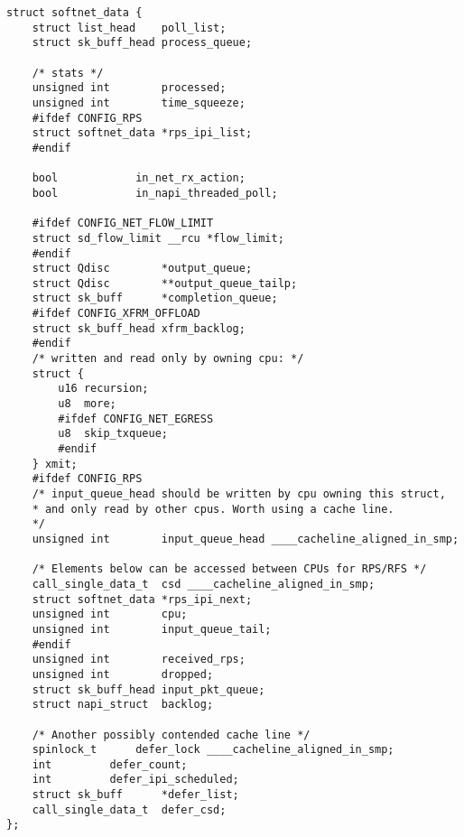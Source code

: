 \begin{center}
	\captionsetup{justification=raggedright,singlelinecheck=off}
	\begin{lstlisting}[label=lst:softnet_data,caption=Структуры softnet\_data]
struct softnet_data {
	struct list_head	poll_list;
	struct sk_buff_head	process_queue;
	
	/* stats */
	unsigned int		processed;
	unsigned int		time_squeeze;
	#ifdef CONFIG_RPS
	struct softnet_data	*rps_ipi_list;
	#endif
	
	bool			in_net_rx_action;
	bool			in_napi_threaded_poll;
	
	#ifdef CONFIG_NET_FLOW_LIMIT
	struct sd_flow_limit __rcu *flow_limit;
	#endif
	struct Qdisc		*output_queue;
	struct Qdisc		**output_queue_tailp;
	struct sk_buff		*completion_queue;
	#ifdef CONFIG_XFRM_OFFLOAD
	struct sk_buff_head	xfrm_backlog;
	#endif
	/* written and read only by owning cpu: */
	struct {
		u16 recursion;
		u8  more;
		#ifdef CONFIG_NET_EGRESS
		u8  skip_txqueue;
		#endif
	} xmit;
	#ifdef CONFIG_RPS
	/* input_queue_head should be written by cpu owning this struct,
	* and only read by other cpus. Worth using a cache line.
	*/
	unsigned int		input_queue_head ____cacheline_aligned_in_smp;
	
	/* Elements below can be accessed between CPUs for RPS/RFS */
	call_single_data_t	csd ____cacheline_aligned_in_smp;
	struct softnet_data	*rps_ipi_next;
	unsigned int		cpu;
	unsigned int		input_queue_tail;
	#endif
	unsigned int		received_rps;
	unsigned int		dropped;
	struct sk_buff_head	input_pkt_queue;
	struct napi_struct	backlog;
	
	/* Another possibly contended cache line */
	spinlock_t		defer_lock ____cacheline_aligned_in_smp;
	int			defer_count;
	int			defer_ipi_scheduled;
	struct sk_buff		*defer_list;
	call_single_data_t	defer_csd;
};		
	\end{lstlisting}
\end{center}
\FloatBarrier

